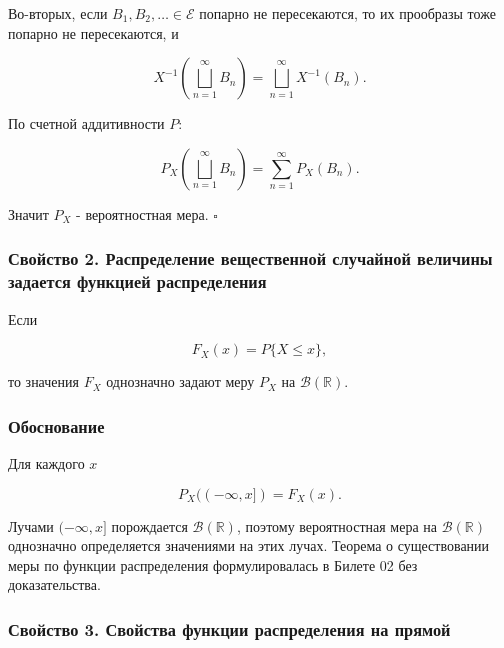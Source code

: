 \documentclass[
  11pt,
  a4paper,
]{article}
\begin{document}
Во-вторых, если \(B_1,B_2,\ldots\in\mathcal E\) попарно не пересекаются,
то их прообразы тоже попарно не пересекаются, и

\[
X^{-1}\left(\bigsqcup_{n=1}^{\infty}B_n\right)
=
\bigsqcup_{n=1}^{\infty}X^{-1}(B_n).
\]

По счетной аддитивности \(P\):

\[
P_X\left(\bigsqcup_{n=1}^{\infty}B_n\right)
=
\sum_{n=1}^{\infty}P_X(B_n).
\]

Значит \(P_X\) - вероятностная мера. \(\square\)

\subsubsection{Свойство 2. Распределение вещественной случайной величины
задается функцией
распределения}\label{ux441ux432ux43eux439ux441ux442ux432ux43e-2.-ux440ux430ux441ux43fux440ux435ux434ux435ux43bux435ux43dux438ux435-ux432ux435ux449ux435ux441ux442ux432ux435ux43dux43dux43eux439-ux441ux43bux443ux447ux430ux439ux43dux43eux439-ux432ux435ux43bux438ux447ux438ux43dux44b-ux437ux430ux434ux430ux435ux442ux441ux44f-ux444ux443ux43dux43aux446ux438ux435ux439-ux440ux430ux441ux43fux440ux435ux434ux435ux43bux435ux43dux438ux44f}

Если

\[
F_X(x)=P\{X\le x\},
\]

то значения \(F_X\) однозначно задают меру \(P_X\) на
\(\mathcal B(\mathbb R)\).

\subsubsection{Обоснование}\label{ux43eux431ux43eux441ux43dux43eux432ux430ux43dux438ux435}

Для каждого \(x\)

\[
P_X((-\infty,x])=F_X(x).
\]

Лучами \((-\infty,x]\) порождается \(\mathcal B(\mathbb R)\), поэтому
вероятностная мера на \(\mathcal B(\mathbb R)\) однозначно определяется
значениями на этих лучах. Теорема о существовании меры по функции
распределения формулировалась в Билете 02 без доказательства.

\subsubsection{Свойство 3. Свойства функции распределения на
прямой}\label{ux441ux432ux43eux439ux441ux442ux432ux43e-3.-ux441ux432ux43eux439ux441ux442ux432ux430-ux444ux443ux43dux43aux446ux438ux438-ux440ux430ux441ux43fux440ux435ux434ux435ux43bux435ux43dux438ux44f-ux43dux430-ux43fux440ux44fux43cux43eux439}
\end{document}
